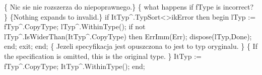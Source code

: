       \{ Nic sie nie rozszerza do niepoprawnego.\}
      \{ what happens if fType is incorrect? \}
      \{Nothing expands to invalid.\}
      if ItTyp^.TypSort<>ikError then
      begin
         lTyp := fTyp^.CopyType;
         lTyp^.WithinType();
         if not lTyp^.IsWiderThan(ItTyp^.CopyType) then ErrImm(Err);
         dispose(lTyp,Done);
      end;
      exit;
   end;
   \{ Jezeli specyfikacja jest opuszczona to jest to typ oryginalu. \}
   \{ If the specification is omitted, this is the original type. \}
   ItTyp := fTyp^.CopyType;
   ItTyp^.WithinType();
end;
\nwendcode{}%

